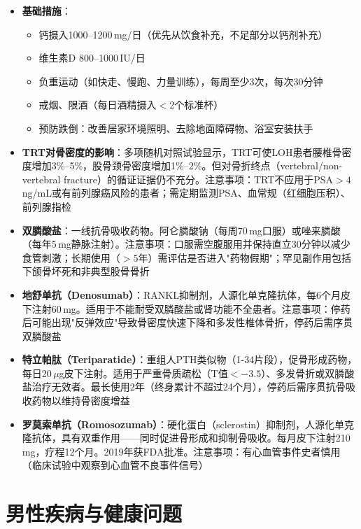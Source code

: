 \documentclass[12pt,a4paper,twoside]{ctexbook}
\begin{document}
\begin{itemize}[leftmargin=2cm]
	\item \textbf{基础措施}：
	\begin{itemize}
		\item 钙摄入1000--1200\,mg/日（优先从饮食补充，不足部分以钙剂补充）
		\item 维生素D 800--1000\,IU/日
		\item 负重运动（如快走、慢跑、力量训练），每周至少3次，每次30分钟
		\item 戒烟、限酒（每日酒精摄入$<$2个标准杯）
		\item 预防跌倒：改善居家环境照明、去除地面障碍物、浴室安装扶手
	\end{itemize}

	\item \textbf{TRT对骨密度的影响}：多项随机对照试验显示，TRT可使LOH患者腰椎骨密度增加3\%--5\%，股骨颈骨密度增加1\%--2\%。但对骨折终点（vertebral/non-vertebral fracture）的循证证据仍不充分。注意事项：TRT不应用于PSA$>4\,$ng/mL或有前列腺癌风险的患者；需定期监测PSA、血常规（红细胞压积）、前列腺指检

	\item \textbf{双膦酸盐}：一线抗骨吸收药物。阿仑膦酸钠（每周70\,mg口服）或唑来膦酸（每年5\,mg静脉注射）。注意事项：口服需空腹服用并保持直立30分钟以减少食管刺激；长期使用（$>5$年）需评估是否进入"药物假期"；罕见副作用包括下颌骨坏死和非典型股骨骨折

	\item \textbf{地舒单抗（Denosumab）}：RANKL抑制剂，人源化单克隆抗体，每6个月皮下注射60\,mg。适用于不能耐受双膦酸盐或肾功能不全患者。注意事项：停药后可能出现"反弹效应"导致骨密度快速下降和多发性椎体骨折，停药后需序贯双膦酸盐

	\item \textbf{特立帕肽（Teriparatide）}：重组人PTH类似物（1-34片段），促骨形成药物，每日20\,$\mu$g皮下注射。适用于严重骨质疏松（T值$< -3.5$）、多发骨折或双膦酸盐治疗无效者。最长使用2年（终身累计不超过24个月），停药后需序贯抗骨吸收药物以维持骨密度增益

	\item \textbf{罗莫索单抗（Romosozumab）}：硬化蛋白（sclerostin）抑制剂，人源化单克隆抗体，具有双重作用——同时促进骨形成和抑制骨吸收。每月皮下注射210\,mg，疗程12个月。2019年获FDA批准。注意事项：有心血管事件史者慎用（临床试验中观察到心血管不良事件信号）
\end{itemize}

\part{男性疾病与健康问题}
\end{document}
